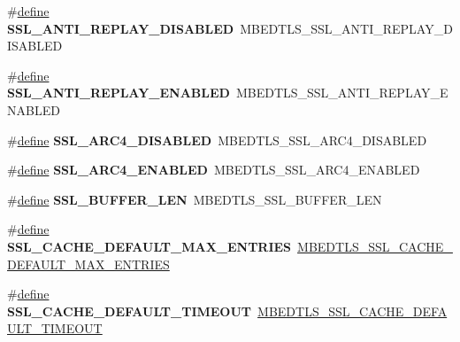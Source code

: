 \begin{DoxyCompactItemize}
\item 
\mbox{\label{compat-1_83_8h_ae79771c906f7ca3084708c44e0ee84f6}} 
\#\hyperlink{structdefine}{define} {\bfseries S\+S\+L\+\_\+\+A\+N\+T\+I\+\_\+\+R\+E\+P\+L\+A\+Y\+\_\+\+D\+I\+S\+A\+B\+L\+ED}~M\+B\+E\+D\+T\+L\+S\+\_\+\+S\+S\+L\+\_\+\+A\+N\+T\+I\+\_\+\+R\+E\+P\+L\+A\+Y\+\_\+\+D\+I\+S\+A\+B\+L\+ED
\item 
\mbox{\label{compat-1_83_8h_ade0c5a5695254757948000be91355a5e}} 
\#\hyperlink{structdefine}{define} {\bfseries S\+S\+L\+\_\+\+A\+N\+T\+I\+\_\+\+R\+E\+P\+L\+A\+Y\+\_\+\+E\+N\+A\+B\+L\+ED}~M\+B\+E\+D\+T\+L\+S\+\_\+\+S\+S\+L\+\_\+\+A\+N\+T\+I\+\_\+\+R\+E\+P\+L\+A\+Y\+\_\+\+E\+N\+A\+B\+L\+ED
\item 
\mbox{\label{compat-1_83_8h_ab7a01e25b1da775e61a7d49802ff8cbb}} 
\#\hyperlink{structdefine}{define} {\bfseries S\+S\+L\+\_\+\+A\+R\+C4\+\_\+\+D\+I\+S\+A\+B\+L\+ED}~M\+B\+E\+D\+T\+L\+S\+\_\+\+S\+S\+L\+\_\+\+A\+R\+C4\+\_\+\+D\+I\+S\+A\+B\+L\+ED
\item 
\mbox{\label{compat-1_83_8h_a8c469962daad86b5f97e53036c687bdb}} 
\#\hyperlink{structdefine}{define} {\bfseries S\+S\+L\+\_\+\+A\+R\+C4\+\_\+\+E\+N\+A\+B\+L\+ED}~M\+B\+E\+D\+T\+L\+S\+\_\+\+S\+S\+L\+\_\+\+A\+R\+C4\+\_\+\+E\+N\+A\+B\+L\+ED
\item 
\mbox{\label{compat-1_83_8h_a70dcd2bbca08cfb787f98019dc98bad5}} 
\#\hyperlink{structdefine}{define} {\bfseries S\+S\+L\+\_\+\+B\+U\+F\+F\+E\+R\+\_\+\+L\+EN}~M\+B\+E\+D\+T\+L\+S\+\_\+\+S\+S\+L\+\_\+\+B\+U\+F\+F\+E\+R\+\_\+\+L\+EN
\item 
\mbox{\label{compat-1_83_8h_ad90e356ca9b417005065a25871b6bd07}} 
\#\hyperlink{structdefine}{define} {\bfseries S\+S\+L\+\_\+\+C\+A\+C\+H\+E\+\_\+\+D\+E\+F\+A\+U\+L\+T\+\_\+\+M\+A\+X\+\_\+\+E\+N\+T\+R\+I\+ES}~\hyperlink{ssl__cache_8h_a03256bf3d0f0c370d6984b441b86567e}{M\+B\+E\+D\+T\+L\+S\+\_\+\+S\+S\+L\+\_\+\+C\+A\+C\+H\+E\+\_\+\+D\+E\+F\+A\+U\+L\+T\+\_\+\+M\+A\+X\+\_\+\+E\+N\+T\+R\+I\+ES}
\item 
\mbox{\label{compat-1_83_8h_a77f926737350e8e702a8323fee6abc90}} 
\#\hyperlink{structdefine}{define} {\bfseries S\+S\+L\+\_\+\+C\+A\+C\+H\+E\+\_\+\+D\+E\+F\+A\+U\+L\+T\+\_\+\+T\+I\+M\+E\+O\+UT}~\hyperlink{ssl__cache_8h_a02b027cfb82a0436a19bfeada16cb8db}{M\+B\+E\+D\+T\+L\+S\+\_\+\+S\+S\+L\+\_\+\+C\+A\+C\+H\+E\+\_\+\+D\+E\+F\+A\+U\+L\+T\+\_\+\+T\+I\+M\+E\+O\+UT}

\end{DoxyCompactItemize}

